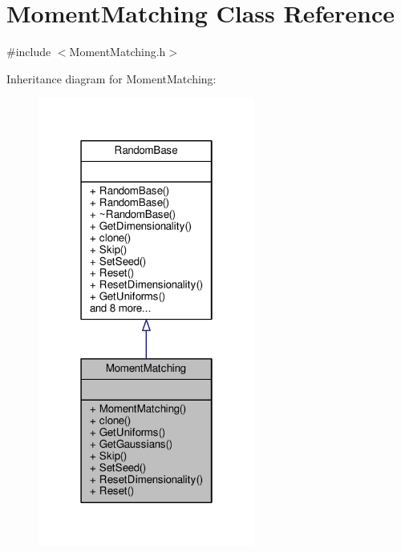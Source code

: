 \hypertarget{classMomentMatching}{}\section{Moment\+Matching Class Reference}
\label{classMomentMatching}


{\ttfamily \#include $<$Moment\+Matching.\+h$>$}



Inheritance diagram for Moment\+Matching\+:
\nopagebreak
\begin{figure}[H]
\begin{center}
\leavevmode
\includegraphics[width=202pt]{classMomentMatching__inherit__graph}
\end{center}
\end{figure}


